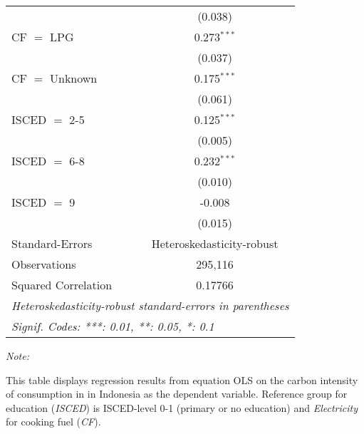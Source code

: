 \begin{table}[htbp!]
\begin{adjustbox}{width = 1\textwidth, max height = 0.95\textheight, center}
\begin{threeparttable}[b]
\begin{tabular}{lc}
                                & (0.038)\\   
            CF $=$ LPG          & 0.273$^{***}$\\   
                                & (0.037)\\   
            CF $=$ Unknown      & 0.175$^{***}$\\   
                                & (0.061)\\   
            ISCED $=$ 2-5       & 0.125$^{***}$\\   
                                & (0.005)\\   
            ISCED $=$ 6-8       & 0.232$^{***}$\\   
                                & (0.010)\\   
            ISCED $=$ 9         & -0.008\\   
                                & (0.015)\\   
            \midrule 
            Standard-Errors     & Heteroskedasticity-robust \\   
            Observations        & 295,116\\  
            Squared Correlation & 0.17766\\  
            \midrule \midrule
            \multicolumn{2}{l}{\emph{Heteroskedasticity-robust standard-errors in parentheses}}\\
            \multicolumn{2}{l}{\emph{Signif. Codes: ***: 0.01, **: 0.05, *: 0.1}}\\
         \end{tabular}
         
         \begin{tablenotes}\item \medskip \textit{Note:}
            \item This table displays regression results from equation OLS on the carbon intensity of consumption in  in Indonesia as the dependent variable. Reference group for education (\textit{ISCED}) is ISCED-level 0-1 (primary or no education) and \textit{Electricity} for cooking fuel (\textit{CF}).
         \end{tablenotes}
      \end{threeparttable}
   \end{adjustbox}
\end{table}


